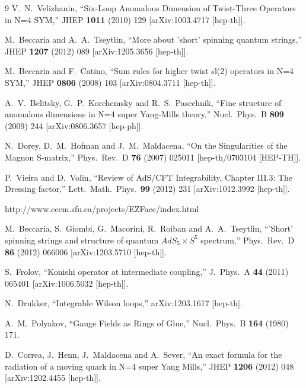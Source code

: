 \documentclass[a4paper,11pt]{article}
\numberwithin{equation}{section}
\begin{document}
\begin{thebibliography} {9}
  V.~N.~Velizhanin,
  ``Six-Loop Anomalous Dimension of Twist-Three Operators in N=4 SYM,''
  JHEP {\bf 1011} (2010) 129
  [arXiv:1003.4717 [hep-th]].

  M.~Beccaria and A.~A.~Tseytlin,
  ``More about 'short' spinning quantum strings,''
  JHEP {\bf 1207} (2012) 089
  [arXiv:1205.3656 [hep-th]].

  M.~Beccaria and F.~Catino,
  ``Sum rules for higher twist sl(2) operators in N=4 SYM,''
  JHEP {\bf 0806} (2008) 103
  [arXiv:0804.3711 [hep-th]].

  A.~V.~Belitsky, G.~P.~Korchemsky and R.~S.~Pasechnik,
  ``Fine structure of anomalous dimensions in N=4 super Yang-Mills theory,''
  Nucl.\ Phys.\ B {\bf 809} (2009) 244
  [arXiv:0806.3657 [hep-ph]].

  N.~Dorey, D.~M.~Hofman and J.~M.~Maldacena,
  ``On the Singularities of the Magnon S-matrix,''
  Phys.\ Rev.\ D {\bf 76} (2007) 025011
  [hep-th/0703104 [HEP-TH]].

  P.~Vieira and D.~Volin,
  ``Review of AdS/CFT Integrability, Chapter III.3: The Dressing factor,''
  Lett.\ Math.\ Phys.\  {\bf 99} (2012) 231
  [arXiv:1012.3992 [hep-th]].

 http://www.cecm.sfu.ca/projects/EZFace/index.html

  M.~Beccaria, S.~Giombi, G.~Macorini, R.~Roiban and A.~A.~Tseytlin,
  ``'Short' spinning strings and structure of quantum $AdS_5 \times S^5$ spectrum,''
  Phys.\ Rev.\ D {\bf 86} (2012) 066006
  [arXiv:1203.5710 [hep-th]].

  S.~Frolov,
  ``Konishi operator at intermediate coupling,''
  J.\ Phys.\ A {\bf 44} (2011) 065401
  [arXiv:1006.5032 [hep-th]].

  N.~Drukker,
  ``Integrable Wilson loops,''
  arXiv:1203.1617 [hep-th].

  A.~M.~Polyakov,
  ``Gauge Fields as Rings of Glue,''
  Nucl.\ Phys.\ B {\bf 164} (1980) 171.

  D.~Correa, J.~Henn, J.~Maldacena and A.~Sever,
  ``An exact formula for the radiation of a moving quark in N=4 super Yang Mills,''
  JHEP {\bf 1206} (2012) 048
  [arXiv:1202.4455 [hep-th]].


\end{thebibliography}
\end{document}
